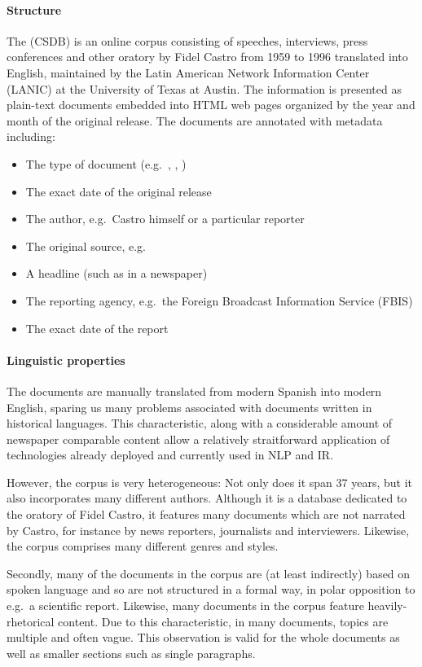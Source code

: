 \paragraph{Structure}
The  (CSDB) is an online corpus consisting of speeches, interviews, press conferences and other oratory by Fidel Castro from 1959 to 1996 translated into English, maintained by the Latin American Network Information Center (LANIC) at the University of Texas at Austin. The information is presented as plain-text documents embedded into HTML web pages organized by the year and month of the original release. The documents are annotated with metadata including:

\begin{itemize}
\item The type of document (e.g.\ , , )
\item The exact date of the original release
\item The author, e.g.\ Castro himself or a particular reporter
\item The original source, e.g.\ 
\item A headline (such as in a newspaper)
\item The reporting agency, e.g.\ the Foreign Broadcast Information Service (FBIS)
\item The exact date of the report
\end{itemize}

\paragraph{Linguistic properties}
The documents are manually translated from modern Spanish into modern English, sparing us many problems associated with documents written in historical languages. This characteristic, along with a considerable amount of newspaper comparable content allow a relatively straitforward application of technologies already deployed and currently used in NLP and IR.

However, the corpus is very heterogeneous: Not only does it span 37 years, but it also incorporates many different authors. Although it is a database dedicated to the oratory of Fidel Castro, it features many documents which are not narrated by Castro, for instance by news reporters, journalists and interviewers. Likewise, the corpus comprises many different genres and styles.

Secondly, many of the documents in the corpus are (at least indirectly) based on spoken language and so are not structured in a formal way, in polar opposition to e.g.\ a scientific report. Likewise, many documents in the corpus feature heavily-rhetorical content. Due to this characteristic, in many documents, topics are multiple and often vague. This observation is valid for the whole documents as well as smaller sections such as single paragraphs. 

